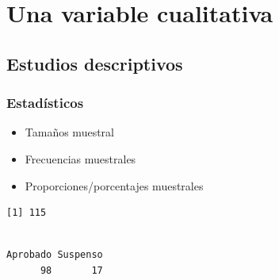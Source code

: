 \documentclass[
  a4paper,
]{scrreport}
\newenvironment{Shaded}{\begin{snugshade}}{\end{snugshade}}
\newcommand{\CommentTok}[1]{\textcolor[rgb]{0.37,0.37,0.37}{#1}}
\newcommand{\FunctionTok}[1]{\textcolor[rgb]{0.28,0.35,0.67}{#1}}
\newcommand{\NormalTok}[1]{\textcolor[rgb]{0.00,0.23,0.31}{#1}}
\newcommand{\SpecialCharTok}[1]{\textcolor[rgb]{0.37,0.37,0.37}{#1}}
\providecommand{\tightlist}{%
  \setlength{\itemsep}{0pt}\setlength{\parskip}{0pt}}\usepackage{longtable,booktabs,array}
\theoremstyle{definition}
\theoremstyle{definition}
\theoremstyle{remark}
\begin{document}
\hypertarget{una-variable-cualitativa}{%
\section{Una variable cualitativa}\label{una-variable-cualitativa}}

\hypertarget{estudios-descriptivos-1}{%
\subsection{Estudios descriptivos}\label{estudios-descriptivos-1}}

\hypertarget{estaduxedsticos-1}{%
\subsubsection{Estadísticos}\label{estaduxedsticos-1}}

\begin{itemize}
\tightlist
\item
  Tamaños muestral
\item
  Frecuencias muestrales
\item
  Proporciones/porcentajes muestrales
\end{itemize}

\begin{Shaded}
\end{Shaded}

\begin{verbatim}
[1] 115
\end{verbatim}

\begin{Shaded}
\end{Shaded}

\begin{verbatim}

Aprobado Suspenso 
      98       17 
\end{verbatim}

\begin{Shaded}
\end{Shaded}
\end{document}
